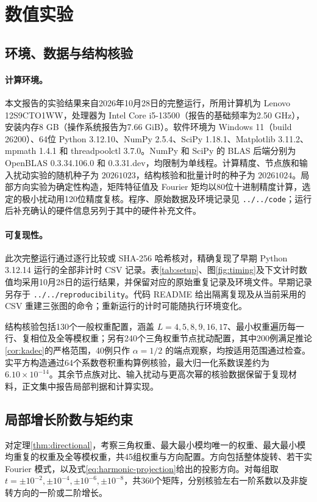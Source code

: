 \documentclass[UTF8,a4paper,zihao=-4,fontset=windows]{ctexart}
\theoremstyle{chinese}
\numberwithin{equation}{section}
\begin{document}
\section{数值实验}
\subsection{环境、数据与结构核验}
\paragraph{计算环境。}
本文报告的实验结果来自2026年10月28日的完整运行，所用计算机为 Lenovo 12S9CTO1WW，处理器为 Intel Core i5-13500（报告的基础频率为2.50 GHz），安装内存8 GB（操作系统报告为7.66 GiB）。软件环境为 Windows 11（build 26200）、64位 Python 3.12.10、NumPy 2.5.4、SciPy 1.18.1、Matplotlib 3.11.2、mpmath 1.4.1 和 threadpoolctl 3.7.0。NumPy 和 SciPy 的 BLAS 后端分别为 OpenBLAS 0.3.34.106.0 和 0.3.31.dev，均限制为单线程。计算精度、节点族和输入扰动实验的随机种子为 $20261023$，结构核验和批量计时的种子为 $20261024$。局部方向实验为确定性构造，矩阵特征值及 Fourier 矩均以80位十进制精度计算，选定的极小扰动用120位精度复核。程序、原始数据及环境记录见 \texttt{../../code}；运行后补充确认的硬件信息另列于其中的硬件补充文件。

\paragraph{可复现性。}
此次完整运行通过逐行比较或 SHA-256 哈希核对，精确复现了早期 Python 3.12.14 运行的全部非计时 CSV 记录。表\ref{tab:setup}、图\ref{fig:timing}及下文计时数值均采用10月28日的运行结果，并保留对应的原始重复记录及环境文件。早期记录另存于 \texttt{../../reproducibility}。代码 README 给出隔离复现及从当前采用的 CSV 重建三张图的命令；重新运行的计时可能随执行环境变化。

结构核验包括130个一般权重配置，涵盖 $L=4,5,8,9,16,17$、最小权重遍历每一行、复相位及全等模权重；另有240个三角权重节点扰动配置，其中200例满足推论\ref{cor:kadec}的严格范围，40例只作 $\alpha=1/2$ 的端点观察，均按适用范围通过检查。实平方构造通过64个系数卷积重构算例核验，最大归一化系数误差约为 $6.10\times10^{-14}$。其余节点族对比、输入扰动与更高次幂的核验数据保留于复现材料，正文集中报告局部判据和计算实现。

\subsection{局部增长阶数与矩约束}
对定理\ref{thm:directional}，考察三角权重、最大最小模均唯一的权重、最大最小模均重复的权重及全等模权重，共45组权重与方向配置。方向包括整体旋转、若干实 Fourier 模式，以及式\eqref{eq:harmonic-projection}给出的投影方向。对每组取 $t=\pm10^{-2},\pm10^{-4},\pm10^{-6},\pm10^{-8}$，共360个矩阵，分别核验左右一阶系数以及非旋转方向的一阶或二阶增长。
\end{document}
